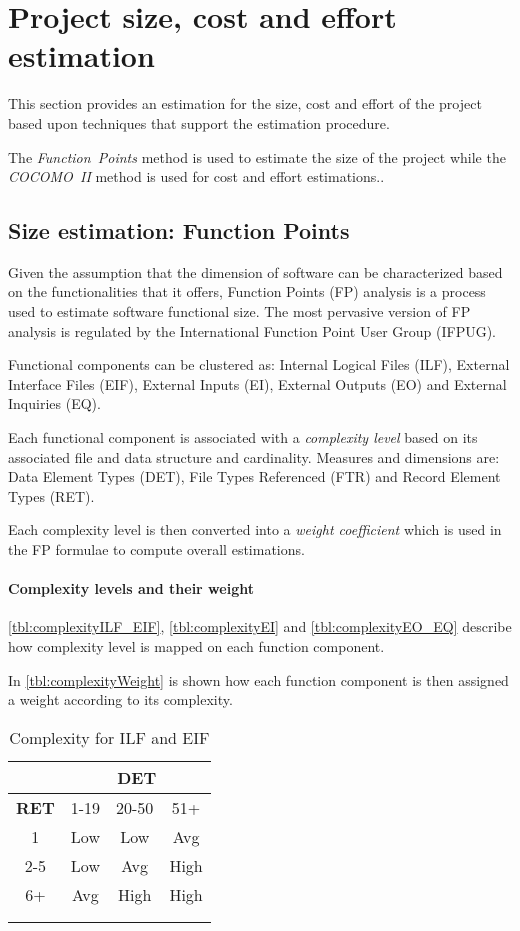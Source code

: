 \section[Project estimations]{Project size, cost and effort estimation}

This section provides an estimation for the size, cost and effort of the project based upon techniques that support the estimation procedure.

The \mbox{\emph{Function Points}} method is used to estimate the size of the project while the  \mbox{\emph{COCOMO II}} method is used for cost and effort estimations..

\subsection{Size estimation: Function Points}
Given the assumption that the dimension of software can be characterized based on the functionalities that it offers, Function Points (FP) analysis is a process used to estimate software functional size. The most pervasive version of FP analysis is regulated by the International Function Point User Group (IFPUG).

Functional components can be clustered as: Internal Logical Files (ILF), External Interface Files (EIF), External Inputs (EI), External Outputs (EO) and External Inquiries (EQ).

Each functional component is associated with a \emph{complexity level} based on its associated file and data structure and cardinality. Measures and dimensions are: Data Element Types (DET), File Types Referenced (FTR) and Record Element Types (RET).

Each complexity level is then converted into a \emph{weight coefficient} which is used in the FP formulae to compute overall estimations.

\paragraph{Complexity levels and their weight}\autoref{tbl:complexityILF_EIF}, \autoref{tbl:complexityEI} and \autoref{tbl:complexityEO_EQ} describe how complexity level is mapped on each function component. 

In \autoref{tbl:complexityWeight} is shown how each function component is then assigned a weight
according to its complexity. \\


\begin{longtable}{cccc}
\toprule
\multicolumn{1}{c}{} & 
\multicolumn{3}{c}{\textbf{DET}}\\
\midrule
\textbf{RET} & 1-19 & 20-50 & 51+ \\
\midrule
1	&	Low	&	Low		&	Avg \\
2-5	&	Low	&	Avg		&	High \\
6+	&	Avg	&	High	&	High\\
\bottomrule \\
\caption{Complexity for ILF and EIF}
\label{tbl:complexityILF_EIF}
\end{longtable}

